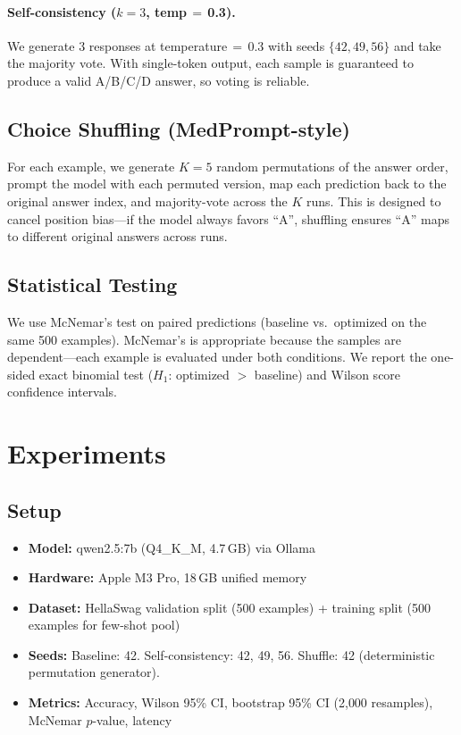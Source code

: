 \documentclass[11pt]{article}
\begin{document}
\paragraph{Self-consistency ($k{=}3$, temp$\,{=}\,$0.3).}
We generate 3 responses at temperature$\,{=}\,$0.3 with seeds $\{42, 49, 56\}$ and take the majority vote. With single-token output, each sample is guaranteed to produce a valid A/B/C/D answer, so voting is reliable.

\subsection{Choice Shuffling (MedPrompt-style)}

For each example, we generate $K{=}5$ random permutations of the answer order, prompt the model with each permuted version, map each prediction back to the original answer index, and majority-vote across the $K$ runs. This is designed to cancel position bias---if the model always favors ``A'', shuffling ensures ``A'' maps to different original answers across runs.

\subsection{Statistical Testing}

We use McNemar's test on paired predictions (baseline vs.\ optimized on the same 500 examples). McNemar's is appropriate because the samples are dependent---each example is evaluated under both conditions. We report the one-sided exact binomial test ($H_1$: optimized $>$ baseline) and Wilson score confidence intervals.

\section{Experiments}

\subsection{Setup}

\begin{itemize}
    \item \textbf{Model:} qwen2.5:7b (Q4\_K\_M, 4.7\,GB) via Ollama
    \item \textbf{Hardware:} Apple M3 Pro, 18\,GB unified memory
    \item \textbf{Dataset:} HellaSwag validation split (500 examples) + training split (500 examples for few-shot pool)
    \item \textbf{Seeds:} Baseline: 42. Self-consistency: 42, 49, 56. Shuffle: 42 (deterministic permutation generator).
    \item \textbf{Metrics:} Accuracy, Wilson 95\% CI, bootstrap 95\% CI (2{,}000 resamples), McNemar $p$-value, latency
\end{itemize}
\end{document}
